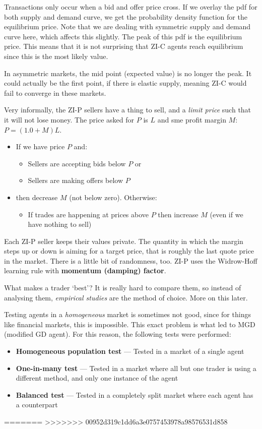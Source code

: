 \documentclass[11pt,a4paper,titlepage,dvipsnames,cmyk]{scrartcl}
\begin{document}
Transactions only occur when a bid and offer price cross. If we overlay the pdf for both supply and demand curve, we get the probability density function for the equilibrium price. Note that we are dealing with symmetric supply and demand curve here, which affects this slightly. The peak of this pdf is the equilibrium price. This means that it is not surprising that ZI-C agents reach equilibrium since this is the most likely value.

In asymmetric markets, the mid point (expected value) is no longer the peak. It could actually be the first point, if there is elastic supply, meaning ZI-C would fail to converge in these markets.

Very informally, the ZI-P sellers have a thing to sell, and a \textit{limit price} such that it will not lose money. The price asked for $P$ is $L$ and sme profit margin $M$: $P=(1.0+M)L$.
\begin{itemize}
    \item If we have price $P$ and:
\begin{itemize}
    \item Sellers are accepting bids below $P$ or
    \item Sellers are making offers below $P$
\end{itemize}
\item then decrease $M$ (not below zero). Otherwise:
\begin{itemize}
    \item If trades are happening at prices above $P$ then increase $M$ (even if we have nothing to sell)
\end{itemize}
\end{itemize}

Each ZI-P seller keeps their values private. The quantity in which the margin steps up or down is aiming for a target price, that is roughly the last quote price in the market. There is a little bit of randomness, too. ZI-P uses the Widrow-Hoff learning rule with \textbf{momentum (damping) factor}.

What makes a trader `best'? It is really hard to compare them, so instead of analysing them, \textit{empirical studies} are the method of choice. More on this later.

Testing agents in a \textit{homogeneous} market is sometimes not good, since for things like financial markets, this is impossible. This exact problem is what led to MGD (modified GD agent). For this reason, the following tests were performed:
\begin{itemize}
    \item \textbf{Homogeneous population test} --- Tested in a market of a single agent
    \item \textbf{One-in-many test} --- Tested in a market where all but one trader is using a different method, and only one instance of the agent
    \item \textbf{Balanced test} --- Tested in a completely split market where each agent has a counterpart
\end{itemize}
=======
>>>>>>> 00952d319c1dd6a3e0757453978a98576531d858
\end{document}
